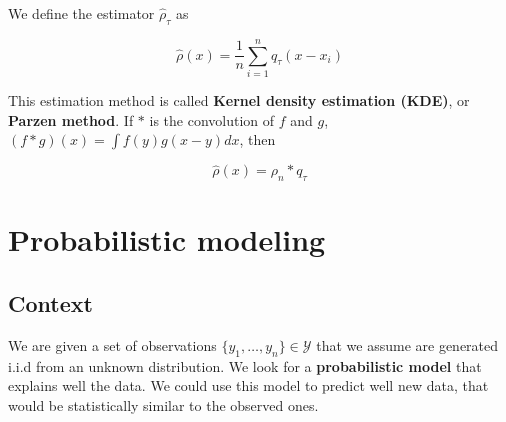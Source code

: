 \documentclass[
10pt, %
a4paper, %
oneside, %
headinclude,footinclude, %
BCOR5mm, %
]{scrartcl}
\begin{document}
We define the estimator $ \hat{\rho}_{\tau}$ as

\begin{equation*}
    \hat{\rho}(x) = \frac{1}{n} \sum^{n}_{i=1} q_{\tau}(x-x_i)
\end{equation*}

This estimation method is called \textbf{{Kernel density estimation (KDE)}}, or \textbf{{Parzen method}}. If $*$ is the convolution of $f$ and $g$, $(f*g)(x)= \int f(y)g(x-y)  dx $, then 

\begin{equation*}
    \hat{\rho}(x) =  \rho_n * q_{\tau}
\end{equation*}

% 
% 
% 

\section{\large\color{Blue}Probabilistic modeling}

\subsection{\large\color{MidnightBlue}Context}

We are given a set of observations $\{y_1, \dots, y_n\}\in \mathcal{Y} $ that we assume are generated i.i.d from an unknown distribution. We look for a \textbf{{probabilistic model}} that explains well the data. We could use this model to predict well new data, that would be statistically similar to the observed ones.
\end{document}
